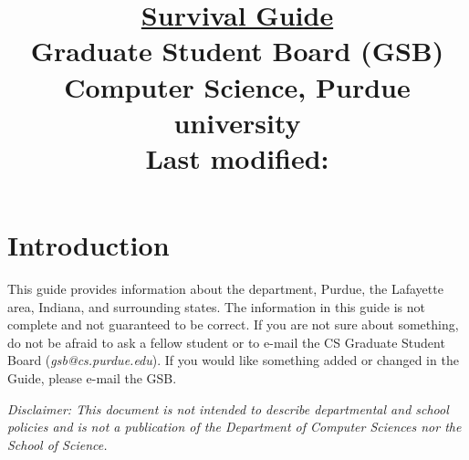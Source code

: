 \documentclass[letterpaper,10pt]{article}
\begin{document}
\date{}

\title{\huge \underline{Survival Guide} \\
Graduate Student Board (GSB) \\
Computer Science, Purdue university \\
\vspace{\baselineskip}
\large Last modified: \filemodprintdate{\jobname}}

\maketitle

\section{Introduction}
This guide provides information about the department, Purdue, the Lafayette area, Indiana, and surrounding states. The information in this guide is not complete and not guaranteed to be correct. If you are not sure about something, do not be afraid to ask a fellow student or to e-mail the CS Graduate Student Board (\emph{gsb@cs.purdue.edu}). If you would like something added or changed in the Guide, please e-mail the GSB.

\textit{Disclaimer: This document is not intended to describe departmental and school policies and is not a publication of the Department of Computer Sciences nor the School of Science.}

\tableofcontents
























\end{document}

